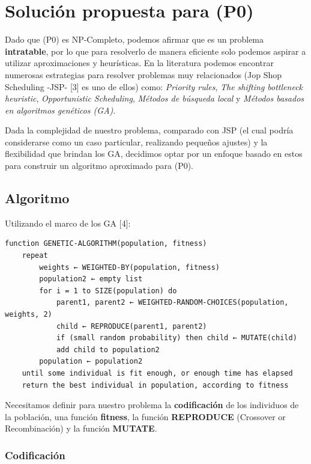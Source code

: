 \documentclass[14pt]{extarticle}
\begin{document}
\section*{Solución propuesta para (P0)}

Dado que (P0) es NP-Completo, podemos afirmar que es un problema \textbf{intratable}, por lo que para resolverlo de manera eficiente solo podemos aspirar a utilizar aproximaciones y heurísticas. En la literatura podemos encontrar numerosas estrategias para resolver problemas muy relacionados (Jop Shop Scheduling -JSP- [3] es uno de ellos) como: \textit{Priority rules}, \textit{The shifting bottleneck heuristic}, \textit{Opportunistic Scheduling}, \textit{Métodos de búsqueda local} y \textit{Métodos basados en algoritmos genéticos (GA)}.

Dada la complejidad de nuestro problema, comparado con JSP (el cual podría considerarse como un caso particular, realizando pequeños ajustes) y la flexibilidad que brindan los GA, decidimos optar por un enfoque basado en estos para construir un algoritmo aproximado para (P0).

\subsection*{Algoritmo}

Utilizando el marco de los GA [4]:

\begin{verbatim}
function GENETIC-ALGORITHM(population, fitness)
    repeat
        weights ← WEIGHTED-BY(population, fitness)
        population2 ← empty list
        for i = 1 to SIZE(population) do
            parent1, parent2 ← WEIGHTED-RANDOM-CHOICES(population, weights, 2)
            child ← REPRODUCE(parent1, parent2)
            if (small random probability) then child ← MUTATE(child)
            add child to population2
        population ← population2
    until some individual is fit enough, or enough time has elapsed
    return the best individual in population, according to fitness
\end{verbatim}

Necesitamos definir para nuestro problema la \textbf{codificación} de los individuos de la población, una función \textbf{fitness}, la función \textbf{REPRODUCE} (Crossover or Recombinación) y la función \textbf{MUTATE}.

\subsubsection*{Codificación}
\end{document}
